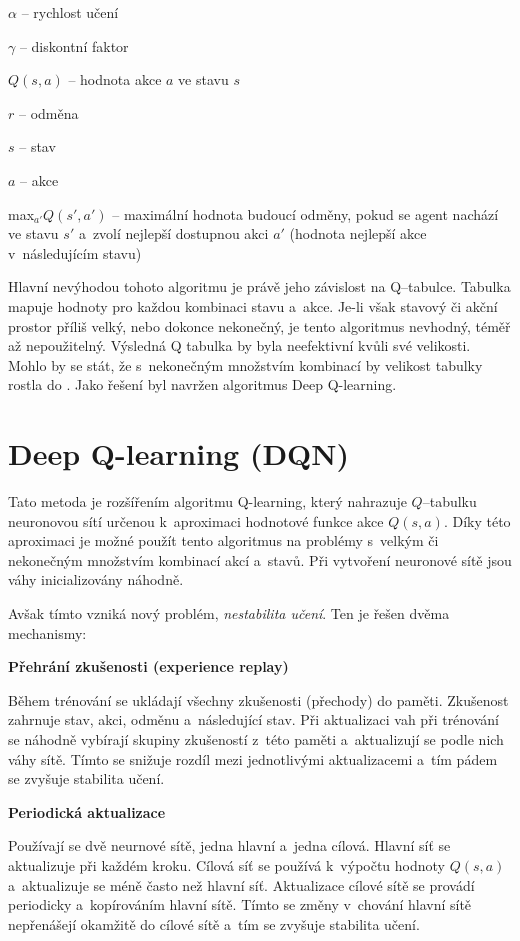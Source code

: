 \begin{myitemize}
  \item $\alpha$ -- rychlost učení
  \item $\gamma$ -- diskontní faktor
  \item $Q(s, a)$ -- hodnota akce $a$ ve stavu $s$
  \item $r$ -- odměna
  \item $s$ -- stav
  \item $a$ -- akce
  \item max$_{a'}Q(s', a')$ -- maximální hodnota budoucí odměny, pokud se agent nachází ve stavu $s'$ a~zvolí nejlepší dostupnou akci $a'$ (hodnota nejlepší akce v~následujícím stavu)
\end{myitemize}

Hlavní nevýhodou tohoto algoritmu je právě jeho závislost na Q--tabulce.
Tabulka mapuje hodnoty pro každou kombinaci stavu a~akce.
Je-li však stavový či akční prostor příliš velký, nebo dokonce nekonečný, je tento algoritmus nevhodný, téměř až nepoužitelný.
Výsledná Q tabulka by byla neefektivní kvůli své velikosti.
Mohlo by se stát, že s~nekonečným množstvím kombinací by velikost tabulky rostla do .
Jako řešení byl navržen algoritmus Deep Q-learning.

\section{Deep Q-learning (DQN)}\label{subsec:deep-q-learning}

Tato metoda je rozšířením algoritmu Q-learning, který nahrazuje $Q$--tabulku neuronovou sítí určenou k~aproximaci hodnotové funkce akce $Q(s, a)$.
Díky této aproximaci je možné použít tento algoritmus na problémy s~velkým či nekonečným množstvím kombinací akcí a~stavů.
Při vytvoření neuronové sítě jsou váhy inicializovány náhodně.

Avšak tímto vzniká nový problém, \emph{nestabilita učení}.
Ten je řešen dvěma mechanismy:

\begin{myitemize}
  \item \textbf{Přehrání zkušenosti (experience replay)}
  
  Během trénování se ukládají všechny zkušenosti (přechody) do paměti.
  Zkušenost zahrnuje stav, akci, odměnu a~následující stav.
  Při aktualizaci vah při trénování se náhodně vybírají skupiny zkušeností z~této paměti a~aktualizují se podle nich váhy sítě.
  Tímto se snižuje rozdíl mezi jednotlivými aktualizacemi a~tím pádem se zvyšuje stabilita učení.

  \item \textbf{Periodická aktualizace}

  Používají se dvě neurnové sítě, jedna hlavní a~jedna cílová.
  Hlavní síť se aktualizuje při každém kroku.
  Cílová síť se používá k~výpočtu hodnoty $Q(s, a)$ a~aktualizuje se méně často než hlavní síť.
  Aktualizace cílové sítě se provádí periodicky a~kopírováním hlavní sítě.
  Tímto se změny v~chování hlavní sítě nepřenášejí okamžitě do cílové sítě a~tím se zvyšuje stabilita učení.

\end{myitemize}

